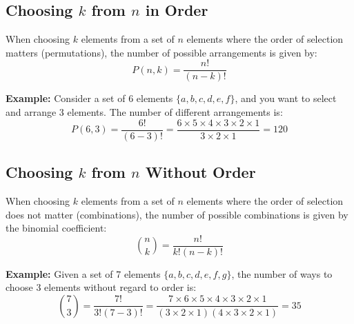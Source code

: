 \documentclass[]{article}
\begin{document}
	\subsection{Choosing $k$ from $n$ in Order}
	When choosing $k$ elements from a set of $n$ elements where the order of selection matters (permutations), the number of possible arrangements is given by:
	\[
	P(n, k) = \frac{n!}{(n-k)!}
	\]
	
	\textbf{Example:} 
	Consider a set of 6 elements $\{a, b, c, d, e, f\}$, and you want to select and arrange 3 elements. The number of different arrangements is:
	\[
	P(6, 3) = \frac{6!}{(6-3)!} = \frac{6 \times 5 \times 4 \times 3 \times 2 \times 1}{3 \times 2 \times 1} = 120
	\]
	
	\subsection{Choosing $k$ from $n$ Without Order}
	When choosing $k$ elements from a set of $n$ elements where the order of selection does not matter (combinations), the number of possible combinations is given by the binomial coefficient:
	\[
	\binom{n}{k} = \frac{n!}{k!(n-k)!}
	\]
	
	\textbf{Example:} 
	Given a set of 7 elements $\{a, b, c, d, e, f, g\}$, the number of ways to choose 3 elements without regard to order is:
	\[
	\binom{7}{3} = \frac{7!}{3!(7-3)!} = \frac{7 \times 6 \times 5 \times 4 \times 3 \times 2 \times 1}{(3 \times 2 \times 1)(4 \times 3 \times 2 \times 1)} = 35
	\]

	
	
\end{document}

